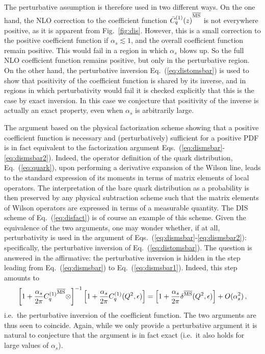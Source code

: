 The perturbative  assumption is therefore used in two different
ways. On the one hand, the NLO correction to the \msbar{}  coefficient function
 ${\bar  C^{(1)}_q(z)}^{{\overline{\textrm{{MS}}}}}$ is not everywhere positive, as it is
apparent from Fig.~\ref{fig:dis}. However, this is a small correction
to the positive coefficient function if $\alpha_s\lesssim 1$, and the
overall coefficient function remain positive. This would fail in a
region in which $\alpha_s$ blows up. So the full NLO coefficient
function remains positive, but only in the perturbative region. On the other
hand, the perturbative inversion Eq.~(\ref{eq:distomsbar}) is used to
show that positivity of the coefficient function is shared by its
inverse, and in regions in which perturbativity would fail it is
checked explicitly that this is the case by exact inversion. In this
case we conjecture that positivity of the inverse is actually an exact
property, even when $\alpha_s$ is arbitrarily large.

The argument based on the physical factorization scheme showing that
a positive coefficient function is necessary and (perturbatively)
sufficient for a positive PDF is in fact equivalent to the
factorization argument
Eqs.~(\ref{eq:dismsbar}-\ref{eq:dismsbar2}). Indeed, 
the operator definition of the quark distribution, Eq.~(\ref{eq:quark}),
upon performing a derivative expansion of the Wilson line, leads to
the standard expression of its moments in terms of matrix elements of
local operators. The interpretation of the bare quark distribution as
a probability  is then
preserved by any physical subtraction scheme such that the matrix
elements of Wilson operators are expressed in terms of a measurable
quantity. The DIS scheme of Eq.~(\ref{eq:disfact}) is of course an
example of this scheme. Given the equivalence of the two arguments,
one may wonder whether, if at all, perturbativity is used in the
argument of Eqs.~(\ref{eq:dismsbar}-\ref{eq:dismsbar2}): specifically,
the perturbative inversion of Eq.~(\ref{eq:distomsbar}). The question is
answered in the affirmative: the perturbative inversion is hidden in the step leading from Eq.~(\ref{eq:dismsbar})
to Eq.~(\ref{eq:dismsbar1}). Indeed, this step amounts to 
\begin{equation}\label{eq:exinv}
\left[1
  +\frac{\alpha_s}{2\pi} {C_{q}^{(1)}}^{{\overline{\textrm{{MS}}}}}\otimes\right]^{-1} \left[1
    +\frac{\alpha_s}{2\pi} C_{q}^{(1)}(Q^2,\epsilon)\right]=
\left[1
    +\frac{\alpha_s}{2\pi} \delta^{{\overline{\textrm{{MS}}}}} (Q^2,\epsilon)\right]
+O(\alpha_s^2) \,,
\end{equation}
i.e.\ the perturbative inversion of the \msbar{} coefficient function. 
The two arguments are thus seen
to coincide. Again, while we only provide a perturbative argument it
is natural to conjecture that the argument is in fact exact (i.e.\ it
also holds for large values of $\alpha_s$).
 



